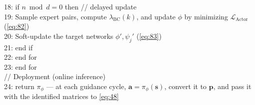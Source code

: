 \begin{algorithm}[H]
{18: \quad\quad if \(n \bmod d = 0\) then \hfill // delayed update\\
19: \quad\quad\quad Sample expert pairs, compute \(\lambda_{\mathrm{BC}}(k)\), and update \(\phi\) by minimizing \(\mathcal{L}_{\mathrm{Actor}}\) (\ref{eq:82})\\
20: \quad\quad\quad Soft-update the target networks \(\phi', \psi_j'\) (\ref{eq:83})\\
21: \quad\quad end if\\
22: \quad end for\\
23: end for\\
// Deployment (online inference)\\
24: return \(\pi_\phi\) --- at each guidance cycle, \(\boldsymbol{a} = \pi_\phi(\boldsymbol{s})\), convert it to \(\boldsymbol{p}\), and pass it with the identified matrices to \eqref{eq:48}
}
\end{algorithm}
